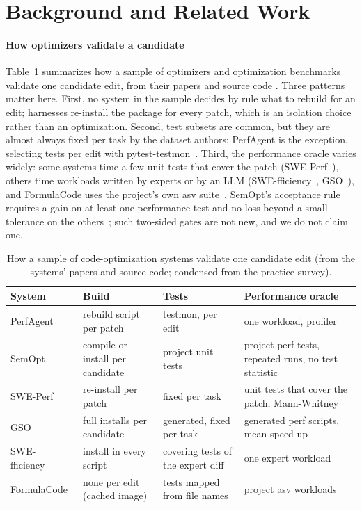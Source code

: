 \section{Background and Related Work}
\label{sec:related}

\paragraph*{How optimizers validate a candidate}
Table~\ref{tab:survey} summarizes how a sample of optimizers and optimization benchmarks validate one candidate edit, from their papers and source code .
Three patterns matter here.
First, no system in the sample decides by rule what to rebuild for an edit; harnesses re-install the package for every patch, which is an isolation choice rather than an optimization.
Second, test subsets are common, but they are almost always fixed per task by the dataset authors; PerfAgent is the exception, selecting tests per edit with pytest-testmon~\cite{deng2026perfagent}.
Third, the performance oracle varies widely: some systems time a few unit tests that cover the patch (SWE-Perf~\cite{he2025sweperf}), others time workloads written by experts or by an LLM (SWE-fficiency~\cite{ma2025swefficiency}, GSO~\cite{gso2025}), and FormulaCode uses the project's own asv suite~\cite{sehgal2026formulacode}.
SemOpt's acceptance rule requires a gain on at least one performance test and no loss beyond a small tolerance on the others~\cite{zhao2026semopt}; such two-sided gates are not new, and we do not claim one.

\begin{table}[t]
\caption{How a sample of code-optimization systems validate one candidate edit (from the systems' papers and source code; condensed from the practice survey).}
\label{tab:survey}
\centering\footnotesize
\begin{tabularx}{\columnwidth}{@{}l>{\raggedright\arraybackslash}X>{\raggedright\arraybackslash}X>{\raggedright\arraybackslash}X@{}}
\toprule
System & Build & Tests & Performance oracle \\
\midrule
PerfAgent~\cite{deng2026perfagent} & rebuild script per patch & testmon, per edit & one workload, profiler \\
SemOpt~\cite{zhao2026semopt} & compile or install per candidate & project unit tests & project perf tests, repeated runs, no test statistic \\
SWE-Perf~\cite{he2025sweperf} & re-install per patch & fixed per task & unit tests that cover the patch, Mann-Whitney \\
GSO~\cite{gso2025} & full installs per candidate & generated, fixed per task & generated perf scripts, mean speed-up \\
SWE-fficiency~\cite{ma2025swefficiency} & install in every script & covering tests of the expert diff & one expert workload \\
FormulaCode~\cite{sehgal2026formulacode} & none per edit (cached image) & tests mapped from file names & project asv workloads \\
\bottomrule
\end{tabularx}
\end{table}

